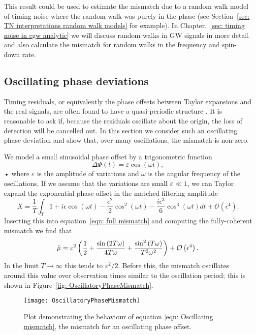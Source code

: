 \documentclass[../full_thesis/full_thesis.tex]{subfiles}
\begin{document}
This result could be used to estimate the mismatch due to a random walk model
of timing noise where the random walk was purely in the phase (see
Section~\ref{sec: TN interpretations random walk models} for example). In
Chapter.~\ref{sec: timing noise in cgw analytic} we will discuss random walks
in GW signals in more detail and also calculate the
mismatch for random walks in the frequency and spin-down rate.

\subsection{Oscillating phase deviations}

Timing residuals, or equivalently the phase offsets between Taylor expansions
and the real signals, are often found to have a quasi-periodic structure
\citep{Hobbs2010}. It is reasonable to ask if, because the residuals oscillate
about the origin, the loss of detection will be cancelled out. In this section
we consider such an oscillating phase deviation and show that, over many
oscillations, the mismatch is non-zero.

We model a small sinusoidal phase offset by a trigonometric function
\begin{equation}
\Delta \Phi(t) = \varepsilon \cos(\omega t),
\end{equation}•
where $\varepsilon$ is the amplitude of variations and $\omega$ is the angular
frequency of the oscillations. If we assume that the variations are small
$\varepsilon \ll 1$, we can Taylor expand the exponential phase offset in
the matched filtering amplitude
\begin{equation}
X = \frac{1}{T}\int_{T}
1 + i \epsilon \cos{\left (\omega t \right )}
- \frac{\epsilon^{2}}{2} \cos^{2}{\left (\omega t \right )}
- \frac{i \epsilon^{3}}{6} \cos^{3}{\left (\omega t \right )}
dt
+ \mathcal{O}\left(\epsilon^{4}\right).
\end{equation}
Inserting this into equation~\eqref{eqn: full mismatch} and computing the
fully-coherent mismatch we find that
\begin{equation}
\tilde{\mu} = \varepsilon^{2} \left(\frac{1}{2}
+ \frac{\sin{\left (2 T \omega \right )}}{4 T \omega}
+ \frac{\sin^{2}{\left (T \omega \right )}}{T^{2} \omega^{2}} \right)
+ \mathcal{O}\left(\epsilon^{4}\right).
\label{eqn: Oscillating mismatch}
\end{equation}
In the limit $T \rightarrow \infty$ this tends to $\varepsilon^{2}/2$. Before
this, the mismatch oscillates around this value over observation times similar
to the oscillation period; this is shown in Figure~\ref{fig:
OscillatoryPhaseMismatch}.
\begin{figure}[ht]
\centering
\texttt{[image: OscillatoryPhaseMismatch]}
\caption{Plot demonstrating the behaviour of equation
         \eqref{eqn: Oscillating mismatch}, the mismatch for an oscillating
         phase offset.}
\label{fig: OscillatoryPhaseMismatch}
\end{figure}
\end{document}
